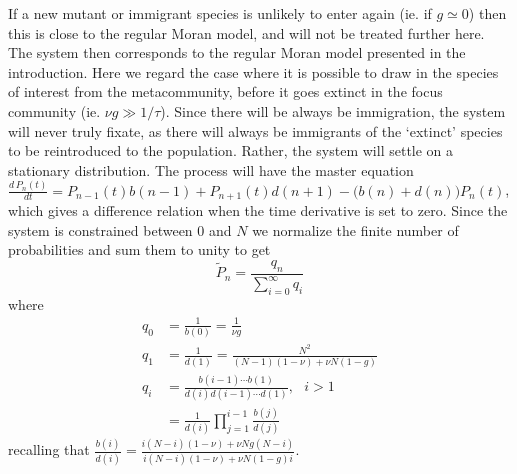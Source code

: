 
If a new mutant or immigrant species is unlikely to enter again (ie. if $g\simeq 0$) then this is close to the regular Moran model, and will not be treated further here. %
The system then corresponds to the regular Moran model presented in the introduction. 
Here we regard the case where it is possible to draw in the species of interest from the metacommunity, before it goes extinct in the focus community (ie. $\nu g \gg 1/\tau$). %
Since there will be always be immigration, the system will never truly fixate, as there will always be immigrants of the `extinct' species to be reintroduced to the population.  
Rather, the system will settle on a stationary distribution. 
The process will have the master equation $\frac{d\,P_n(t)}{dt} = P_{n-1}(t)b(n-1) + P_{n+1}(t)d(n+1) - \big(b(n)+d(n)\big)P_n(t)$,
which gives a difference relation when the time derivative is set to zero. 
Since the system is constrained between $0$ and $N$ we normalize the finite number of probabilities and sum them to unity to get
\begin{equation}
\widetilde{P}_n = \frac{q_n}{\sum_{i=0}^\infty q_i}
\end{equation}
where
\begin{align*}
 q_0 &= \frac{1}{b(0)} = \frac{1}{\nu g} \\
 q_1 &= \frac{1}{d(1)} = \frac{N^2}{(N-1)(1-\nu) + \nu N(1-g)} \\
 q_i &= \frac{b(i-1)\cdots b(1)}{d(i)d(i-1)\cdots d(1)}, \text{  } i>1 \\
     &= \frac{1}{d(i)}\prod_{j=1}^{i-1}\frac{b(j)}{d(j)}
\end{align*}
recalling that $\frac{b(i)}{d(i)} = \frac{i(N-i)(1-\nu) + \nu Ng(N-i)}{i(N-i)(1-\nu) + \nu N(1-g)i}$.
